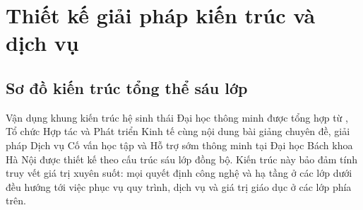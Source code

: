 \section{Thiết kế giải pháp kiến trúc và dịch vụ}

\subsection{Sơ đồ kiến trúc tổng thể sáu lớp}
Vận dụng khung kiến trúc hệ sinh thái Đại học thông minh được tổng hợp từ \citet{uskov2018}, Tổ chức Hợp tác và Phát triển Kinh tế \citep{oecd2023} cùng nội dung bài giảng chuyên đề, giải pháp Dịch vụ Cố vấn học tập và Hỗ trợ sớm thông minh tại Đại học Bách khoa Hà Nội được thiết kế theo cấu trúc sáu lớp đồng bộ. Kiến trúc này bảo đảm tính truy vết giá trị xuyên suốt: mọi quyết định công nghệ và hạ tầng ở các lớp dưới đều hướng tới việc phục vụ quy trình, dịch vụ và giá trị giáo dục ở các lớp phía trên.

